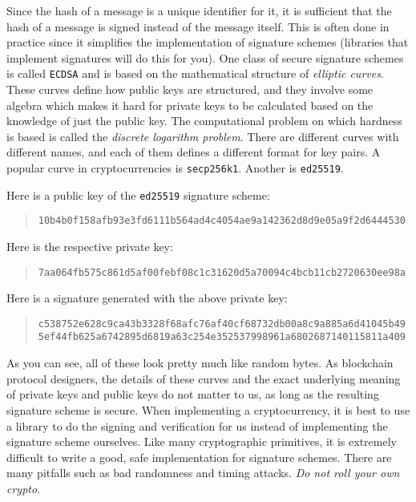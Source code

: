 Since the hash of a message is a unique identifier for it, it is sufficient that
the hash of a message is signed instead of the message itself. This is often done
in practice since it simplifies the implementation of signature schemes (libraries that implement
signatures will do this for you).
One class of secure signature schemes is called
\texttt{ECDSA} and is based on the mathematical structure of \emph{elliptic curves}.
These curves define how public keys are structured, and they involve some algebra
which makes it hard for private keys to be calculated based on the knowledge of
just the public key. The computational problem on which hardness is based is called
the \emph{discrete logarithm problem}.
There are different curves with different names, and each of them
defines a different format for key pairs.
A popular curve in cryptocurrencies is
\texttt{secp256k1}. Another is \texttt{ed25519}.

Here is a public key of the \texttt{ed25519} signature scheme:

\begin{quote}
\texttt{10b4b0f158afb93e3fd6111b564ad4c4054ae9a142362d8d9e05a9f2d6444530}
\end{quote}

Here is the respective private key:

\begin{quote}
\texttt{7aa064fb575c861d5af00febf08c1c31620d5a70094c4bcb11cb2720630ee98a}
\end{quote}

Here is a signature generated with the above private key:

\begin{quote}
\texttt{c538752e628c9ca43b3328f68afc76af40cf68732db00a8c9a885a6d41045b49}\linebreak
\texttt{5ef44fb625a6742895d6819a63c254e352537998961a6802687140115811a409}
\end{quote}

As you can see, all of these look pretty much like random bytes.
As blockchain protocol designers,
the details of these curves and the exact underlying meaning of private keys and public keys
do not matter to us, as long as the resulting signature
scheme is secure. When implementing a cryptocurrency, it is best to use a library
to do the signing and verification for us instead of implementing the signature
scheme ourselves. Like many cryptographic primitives, it is extremely difficult to
write a good, safe implementation for signature schemes. There are many pitfalls
such as bad randomness and timing attacks. \emph{Do not roll your own crypto.}

